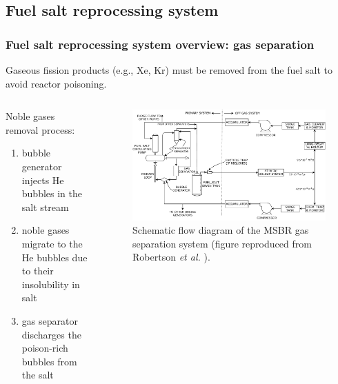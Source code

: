 \subsection{Fuel salt reprocessing system}

\begin{frame}
  \frametitle{Fuel salt reprocessing system overview: gas separation}
  Gaseous fission products (e.g., Xe, Kr) must be removed from the fuel salt 
  to avoid reactor
poisoning. 
  
      \begin{columns}
      	\column[t]{4.5cm}
    \begin{block}{Noble gases removal process:}
      \begin{enumerate}
      	\item bubble generator injects He bubbles in the salt stream
      	\item noble gases migrate to the He bubbles due to their insolubility 
      	in salt
      	\item gas separator discharges the poison-rich bubbles from the salt
      \end{enumerate}
    \end{block}    	
      	
     	\column[t]{7cm}
  \begin{figure}[t]
	  \centering
	  		\vspace{-8mm}
		\includegraphics[width=1.03\textwidth]{../figures/gas_separation.pdf}
	\caption{Schematic flow diagram of the \gls{MSBR} gas separation system 
	(figure reproduced from Robertson \emph{et al.}  
	\cite{robertson_conceptual_1971}).} 
    \end{figure}

	\end{columns}
\end{frame}

